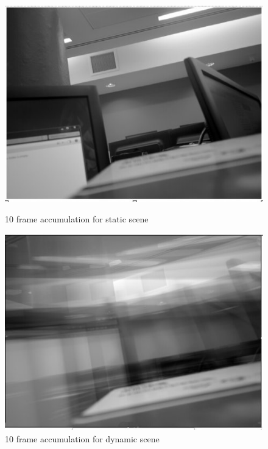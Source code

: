 \documentclass[11pt]{article} %
\begin{document}
{{\begin{figure}[H]
\begin{minipage}{0.4\textwidth}
\centering
\includegraphics[width=\textwidth]{../images/accumstatic}\caption{10 frame accumulation for static scene}\label{accumst}
\end{minipage}
\hspace{30pt}
\begin{minipage}{0.4\textwidth}
\centering
\includegraphics[width=\textwidth]{../images/accumdynamic}\caption{10 frame accumulation for dynamic scene}\label{accumdy}
\end{minipage}
\end{figure}

}}
\end{document}
